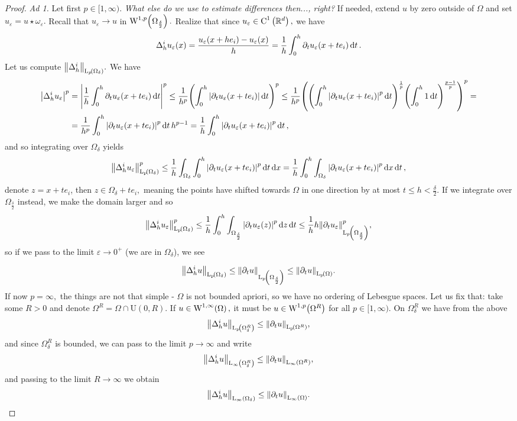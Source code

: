\documentclass{article}
\begin{document}
\begin{proof}
	\textit{Ad 1.}
	Let first $p \in [1, \infty).$ \textit{What else do we use to estimate differences then..., right?} If needed, extend $u$ by zero outside of $\Omega$ and set $u_{\varepsilon} = u \star \omega_{\varepsilon}.$ Recall that $u_{\varepsilon} \to u$ in $\WkpSet[1][p]{\Omega_{\frac{\delta}{2}}}.$ Realize that since $u_{\varepsilon} \in \text{C}^{1}\!\,\left({\mathbb R}^{d} \right),$ we have
	\[
		\Delta_h^i u_{\varepsilon}(x) = \frac{u_{\varepsilon}\qty(x+h e_i)- u_{\varepsilon}\qty(x)}{h} = \frac{1}{h}\int_0^h \partial_{t} u_{\varepsilon}\qty(x+te_i)\dd{t}.
	\]
	Let us compute $\norm{\Delta_h^i}_{\LpSet[p]{\Omega_{\delta}}}.$ We have
	\begin{align*}
		\abs{\Delta_h^i u_{\varepsilon}}^{p} &= \abs{\frac{1}{h}\int_0^h \partial_{t} u_{\varepsilon}\qty(x+te_i)\dd{t}}^p \leq \frac{1}{h^p}\qty(\int_0^h \abs{\partial_t u_{\varepsilon}\qty(x+te_i)}\dd{t})^p \leq \frac{1}{h^p}\qty(\qty(\int_0^h \abs{\partial_t u_{\varepsilon}\qty(x+te_i)}^p \dd{t})^{\frac{1}{p}}\qty(\int_0^h 1 \dd{t})^{\frac{p-1}{p}})^p = \\ 
				       &=\frac{1}{h^p}\int_0^h \abs{\partial_t u_{\varepsilon}(x+te_i)}^p \dd{t}h^{p-1} = \frac{1}{h}\int_0^h \abs{\partial_t u_{\varepsilon}\qty(x+te_i)}^p\dd{t},
	\end{align*}
	and so integrating over $\Omega_{\delta}$ yields
	\[
		\norm{\Delta_h^i u_{\varepsilon}}_{\LpSet{\Omega_{\delta}}}^p \leq \frac{1}{h} \int_{\Omega_{\delta}}\int_0^h \abs{\partial_t u_{\varepsilon}\qty(x+te_i)}^p\dd{t}\dd{x} = \frac{1}{h}\int_0^h \int_{\Omega_{\delta}}\abs{\partial_t u_{\varepsilon}\qty(x+te_i)}^p\dd{x}\dd{t},
	\]
	denote $z = x + te_i$, then $z \in \Omega_{\delta} + te_i,$ meaning the points have shifted towards $\Omega$ in one direction by at most $t \leq h < \frac{\delta}{2}.$ If we integrate over $\Omega_{\frac{\delta}{2}}$ instead, we make the domain larger and so 
	\[
		\norm{\Delta_h^i u_{\varepsilon}}_{\LpSet{\Omega_{\delta}}}^p\leq \frac{1}{h}\int_0^h \int_{\Omega_{\frac{\delta}{2}}}\abs{\partial_t u_{\varepsilon}(z)}^p\dd{z}\dd{t}\leq \frac{1}{h} h \norm{\partial_t u_{\varepsilon}}_{\LpSet[p]{\Omega_{\frac{\delta}{2}}}}^p,
	\]
	so if we pass to the limit $\varepsilon \to 0^+$ (we are in $\Omega_{\delta}$), we see

	\[
		\norm{\Delta_h^i u}_{\LpSet{\Omega_{\delta}}} \leq \norm{\partial_t u}_{\LpSet{\Omega_{\frac{\delta}{2}}}} \leq \norm{\partial_t u}_{\LpSet{\Omega}}.
	\]
	If now $p = \infty,$ the things are not that simple - $\Omega$ is not bounded apriori, so we have no ordering of Lebesgue spaces. Let us fix that: take some $R>0$ and denote $\Omega^R = \Omega \cap \text{U}(0,R).$ If $u \in \WkpSet[1][\infty]{\Omega},$ it must be $u \in \WkpSet[1][p]{\Omega^R}$ for all $p \in [1, \infty).$ On $\Omega^R_{\delta}$ we have from the above
	\[
		\norm{\Delta_h^i u}_{\LpSet{\Omega_{\delta}^R}}\leq \norm{\partial_t u}_{\LpSet{\Omega^R}},
	\]
	and since $\Omega_{\delta}^R$ is bounded, we can pass to the limit $p \to \infty$ and write
	\[
		\norm{\Delta_h^i u}_{\text{L}_{\infty}\!\,\left(\Omega_{\delta}^R \right)}\leq \norm{\partial_t u}_{\text{L}_{\infty}\!\,\left(\Omega^R \right)},
	\]
	and passing to the limit $R \to \infty$ we obtain
	\[
		\norm{\Delta_{h}^i u}_{\text{L}_{\infty}\!\,\left(\Omega_{\delta} \right)} \leq \norm{\partial_t u}_{\text{L}_{\infty}\!\,\left(\Omega \right)}.
	\]


\end{proof}
\end{document}
